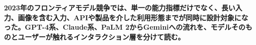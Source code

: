 \noindent\textbf{2023年のフロンティアモデル競争では、単一の能力指標だけでなく、長い入力、画像を含む入力、APIや製品を介した利用形態までが同時に設計対象になった。GPT-4系、Claude系、PaLM 2からGeminiへの流れを、モデルそのものとユーザーが触れるインタラクション層を分けて読む。}\autocite{src-013fa77665db,src-2b6af707f3ef,src-3375c5d27d9b,src-39071a9443e5,src-5bfa9c93d034,src-93d355bf8806,src-a3dead6cff65,src-a95452783369,src-b1525886b462,src-db671ee1d1b8,src-e116708067ab,src-f5041642fb21,src-f951bda6a0f4,src-fd9cb9c0061f}

